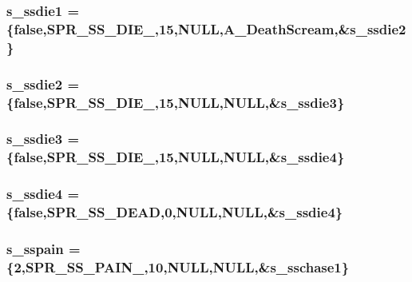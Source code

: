 \label{WL__ACT2_8C_a21f06af6990617be09e45eb957e3ce55}
\hypertarget{WL__ACT2_8C_ab17dfc4394913bd79a55ab99142b43f4}{
\subsubsection[{s\_\-ssdie1}]{ {\bf s\_\-ssdie1} = \{false,SPR\_\-SS\_\-DIE\_,15,NULL,A\_\-DeathScream,\&{\bf s\_\-ssdie2}\}}}
\label{WL__ACT2_8C_ab17dfc4394913bd79a55ab99142b43f4}
\hypertarget{WL__ACT2_8C_aafcb04752e08726482a09ab5bc1cdecb}{
\subsubsection[{s\_\-ssdie2}]{ {\bf s\_\-ssdie2} = \{false,SPR\_\-SS\_\-DIE\_,15,NULL,NULL,\&{\bf s\_\-ssdie3}\}}}
\label{WL__ACT2_8C_aafcb04752e08726482a09ab5bc1cdecb}
\hypertarget{WL__ACT2_8C_abe1d5efae7ccb8a411b8f58990e6686d}{
\subsubsection[{s\_\-ssdie3}]{ {\bf s\_\-ssdie3} = \{false,SPR\_\-SS\_\-DIE\_,15,NULL,NULL,\&{\bf s\_\-ssdie4}\}}}
\label{WL__ACT2_8C_abe1d5efae7ccb8a411b8f58990e6686d}
\hypertarget{WL__ACT2_8C_a6c3ddc5927a9f4e0ebb04eb5057927e4}{
\subsubsection[{s\_\-ssdie4}]{ {\bf s\_\-ssdie4} = \{false,SPR\_\-SS\_\-DEAD,0,NULL,NULL,\&{\bf s\_\-ssdie4}\}}}
\label{WL__ACT2_8C_a6c3ddc5927a9f4e0ebb04eb5057927e4}
\hypertarget{WL__ACT2_8C_ab483f8908a6f7bdccb624e36aa194b10}{
\subsubsection[{s\_\-sspain}]{ {\bf s\_\-sspain} = \{2,SPR\_\-SS\_\-PAIN\_,10,NULL,NULL,\&{\bf s\_\-sschase1}\}}}
